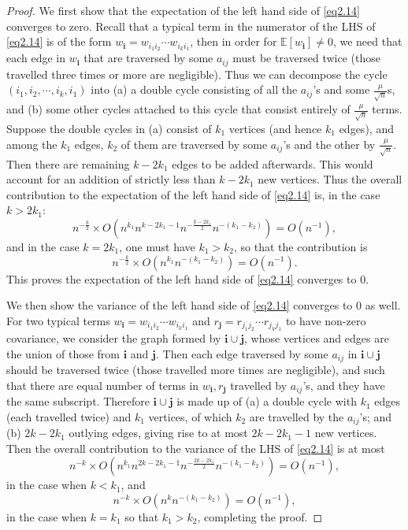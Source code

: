 \documentclass[12pt, reqno]{amsart}
\theoremstyle{definition}
\theoremstyle{remark}
\numberwithin{equation}{section}
\begin{document}
\begin{proof} We first show that the expectation of the left hand side of \eqref{eq2.14} converges to zero. Recall that a typical term in the numerator of the LHS of \eqref{eq2.14} is of the form $w_{\mathbf{i}}=w_{i_1i_2}\cdots w_{i_ki_1}$, then in order for $\mathbb{E}[w_\mathbf{i}]\neq 0$, we need that each edge in $w_\mathbf{i}$ that are traversed by some $a_{ij}$ must be traversed twice (those travelled three times or more are negligible). Thus we can decompose the cycle $(i_1,i_2,\cdots,i_{k},i_1)$ into (a) a double cycle consisting of all the $a_{ij}$'s and some $\frac{\mu}{\sqrt{n}}$s, and (b) some other cycles attached to this cycle that consist entirely of $\frac{\mu}{\sqrt{n}}$ terms. Suppose the double cycles in (a) consist of $k_1$ vertices (and hence $k_1$ edges), and among the $k_1$ edges, $k_2$ of them are traversed by some $a_{ij}$'s and the other by $\frac{\mu}{\sqrt{n}}$.  Then there are remaining $k-2k_1$ edges to be added afterwards. This would account for an addition of strictly less than $k-2k_1$ new vertices. Thus the overall contribution to the expectation of the left hand side of \eqref{eq2.14} is, in the case $k>2k_1$: 
$$
n^{-\frac{k}{2}}\times O(n^{k_1}n^{k-2k_1-1}n^{-\frac{k-2k_1}{2}}n^{-(k_1-k_2)})=O(n^{-1}),
$$
and in the case $k=2k_1$, one must have $k_1>k_2$, so that the contribution is
$$
n^{-\frac{k}{2}}\times O(n^{k_1}n^{-(k_1-k_2)})=O(n^{-1}).
$$
This proves the expectation of the left hand side of \eqref{eq2.14} converges to $0$.

We then show the variance of the left hand side of \eqref{eq2.14} converges to $0$ as well. For two typical terms $w_{\mathbf{i}}=w_{i_1i_2}\cdots w_{i_ki_1}$ and $r_{\mathbf{j}}=r_{j_1j_2}\cdots r_{j_kj_1}$ to have non-zero covariance, we consider the graph formed by $\mathbf{i}\cup\mathbf{j}$, whose vertices and edges are the union of those from $\mathbf{i}$ and $\mathbf{j}$. Then each edge traversed by some $a_{ij}$ in $\mathbf{i}\cup\mathbf{j}$ should be traversed twice (those travelled more times are negligible), and such that there are equal number of terms in $w_\mathbf{i},r_\mathbf{j}$ travelled by $a_{ij}$'s, and they have the same subscript. Therefore $\mathbf{i}\cup\mathbf{j}$ is made up of (a) a double cycle with $k_1$ edges (each travelled twice) and $k_1$ vertices, of which $k_2$ are travelled by the $a_{ij}$'s; and (b) $2k-2k_1$ outlying edges, giving rise to at most $2k-2k_1-1$ new vertices. Then the overall contribution to the variance of the LHS of \eqref{eq2.14} is at most 
$$
n^{-k}\times O(n^{k_1}n^{2k-2k_1-1}n^{-\frac{2k-2k_1}{2}}n^{-(k_1-k_2)})=O(n^{-1}),
$$ in the case when $k<k_1$,
and 
$$
n^{-k}\times O(n^kn^{-(k_1-k_2)})=O(n^{-1}),$$
in the case when $k=k_1$ so that $k_1>k_2$,
completing the proof.
\end{proof}
\end{document}
